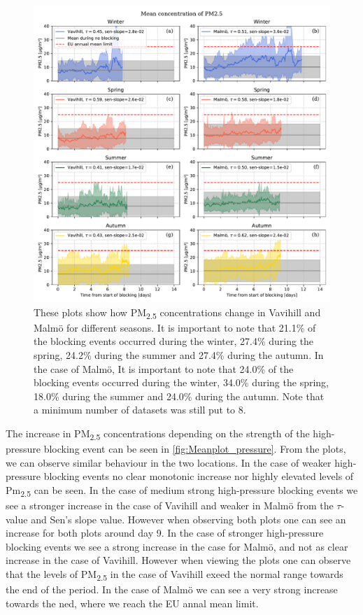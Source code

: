 \begin{figure}[H]
    \centering
    \includegraphics[width=\textwidth]{Figures/Meanplot_seasonal.pdf}
    \caption{These plots show how PM\textsubscript{2.5} concentrations change in Vavihill and Malmö for different seasons. It is important to note that 21.1\% of the blocking events occurred during the winter, 27.4\% during the spring, 24.2\% during the summer and 27.4\% during the autumn. In the case of Malmö, It is important to note that 24.0\% of the blocking events occurred during the winter, 34.0\% during the spring, 18.0\% during the summer and 24.0\% during the autumn. Note that a minimum number of datasets was still put to 8.}
    \label{fig:Meanplot_seasonal}
\end{figure}

The increase in PM\textsubscript{2.5} concentrations depending on the strength of the high-pressure blocking event can be seen in \autoref{fig:Meanplot_pressure}. From the plots, we can observe similar behaviour in the two locations. In the case of weaker high-pressure blocking events no clear monotonic increase nor highly elevated levels of Pm\textsubscript{2.5} can be seen. In the case of medium strong high-pressure blocking events we see a stronger increase in the case of Vavihill and weaker in Malmö from the $\tau$-value and Sen's slope value. However when observing both plots one can see an increase for both plots around day 9. In the case of stronger high-pressure blocking events we see a strong increase in the case for Malmö, and not as clear increase in the case of Vavihill. However when viewing the plots one can observe that the levels of PM\textsubscript{2.5} in the case of Vavihill exeed the normal range towards the end of the period. In the case of Malmö we can see a very strong increase towards the ned, where we reach the EU annal mean limit. 

